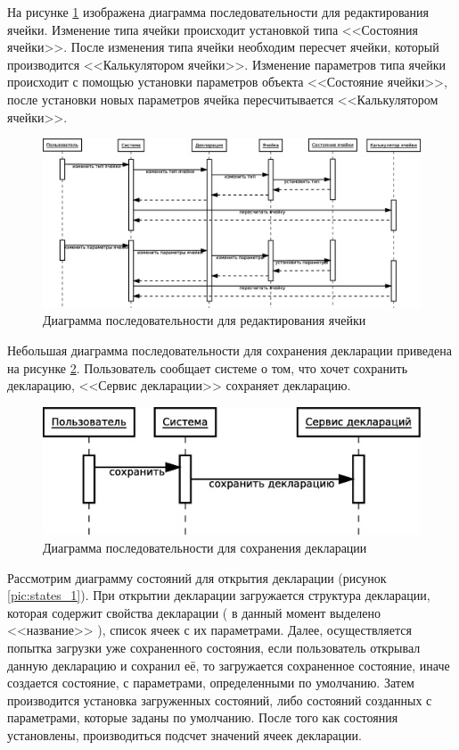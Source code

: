 \documentclass[14pt,a4paper]{reportmod}
\begin{document}
На рисунке \ref{pic:sequence_4_} изображена диаграмма последовательности для редактирования ячейки. Изменение типа ячейки происходит установкой типа <<Состояния ячейки>>. После изменения типа ячейки необходим пересчет ячейки, который производится <<Калькулятором ячейки>>. Изменение параметров типа ячейки происходит с помощью установки параметров объекта <<Состояние ячейки>>, после установки новых параметров ячейка пересчитывается <<Калькулятором ячейки>>.

\begin{figure}
  \centering
  \includegraphics[scale=0.4]{uml/_sequence_2}
  \caption{Диаграмма последовательности для редактирования ячейки}
  \label{pic:sequence_4_}
\end{figure}

Небольшая диаграмма последовательности для сохранения декларации приведена на рисунке \ref{pic:sequence_5}. Пользователь сообщает системе о том, что хочет сохранить декларацию, <<Сервис декларации>> сохраняет декларацию.

\begin{figure}
  \centering
  \includegraphics[scale=0.4]{uml/_sequence_3}
  \caption{Диаграмма последовательности для сохранения декларации}
  \label{pic:sequence_5}
\end{figure}

Рассмотрим диаграмму состояний для открытия декларации (рисунок \ref{pic:states_1}). При открытии декларации загружается структура декларации, которая содержит свойства декларации ( в данный момент выделено <<название>> ), список ячеек с их параметрами. Далее, осуществляется попытка загрузки уже сохраненного состояния, если пользователь открывал данную декларацию и сохранил её, то загружается сохраненное состояние, иначе создается состояние, с параметрами, определенными по умолчанию. Затем производится установка загруженных состояний, либо состояний созданных с параметрами, которые заданы по умолчанию. После того как состояния установлены, производиться подсчет значений ячеек декларации.
\end{document}
